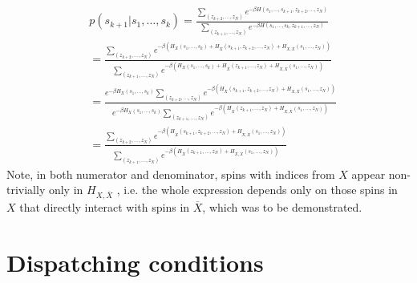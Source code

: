     \begin{align}
      &p(s_{k+1}|s_1, \ldots, s_k) = \frac{\sum\limits_{(z_{k+2}, \ldots, z_N)}e^{-\beta H(s_1, \ldots, s_{k+1}, z_{k+2},\ldots,z_N)}}{\sum\limits_{(z_{k+1}, \ldots, z_N)}e^{-\beta H(s_1, \ldots, s_k, z_{k+1},\ldots,z_N)}}                                                                                                                                                     \\
                                  & = \frac{\sum\limits_{(z_{k+2}, \ldots, z_N)}e^{-\beta (H_X(s_1, \ldots, s_k) + H_{\overline{X}}(s_{k+1}, z_{k+2},\ldots,z_N) + H_{X, \overline{X}}(s_1, \ldots, z_N))}}{\sum\limits_{(z_{k+1}, \ldots, z_N)}e^{-\beta (H_X(s_1, \ldots, s_k) + H_{\overline{X}}(z_{k+1}, \ldots,z_N) + H_{X, \overline{X}}(s_1, \ldots, z_N))}}                 \\
                                  & = \frac{e^{-\beta H_X(s_1, \ldots, s_k)}\sum\limits_{(z_{k+2}, \ldots, z_N)} e^{-\beta(H_{\overline{X}}(s_{k+1}, z_{k+2},\ldots,z_N) + H_{X, \overline{X}}(s_1, \ldots, z_N))}}{e^{-\beta H_X(s_1, \ldots, s_k)}\sum\limits_{(z_{k+1}, \ldots, z_N)}e^{ -\beta(H_{\overline{X}}(z_{k+1}, \ldots,z_N) + H_{X, \overline{X}}(s_1, \ldots, z_N))}} \\
                                  & = \frac{\sum\limits_{(z_{k+2}, \ldots, z_N)} e^{-\beta(H_{\overline{X}}(s_{k+1}, z_{k+2},\ldots,z_N) + H_{X, \overline{X}}(s_1, \ldots, z_N))}}{\sum\limits_{(z_{k+1}, \ldots, z_N)}e^{ -\beta(H_{\overline{X}}(z_{k+1}, \ldots,z_N) + H_{X, \overline{X}}(s_1, \ldots, z_N))}}
      \end{align}
    Note, in both numerator and denominator, spins with indices from $X$ appear
    non-trivially only in $H_{X, \overline{X}}$ , i.e. the whole expression depends
    only on those spins in $X$ that directly interact with spins in $\overline{X}$,
    which was to be demonstrated.

    \chapter{Dispatching conditions}
    \label{chapter:dispatching}
